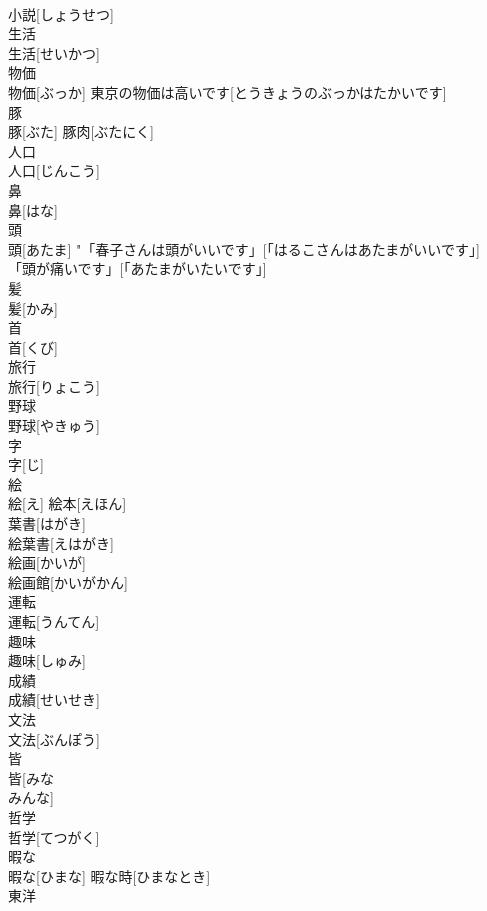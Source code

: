 \documentclass[8pt]{extreport}
\begin{document}
\begin{CJK}{UTF8}{min}
\\	小説[しょうせつ]	
\\	生活	
\\	生活[せいかつ]	
\\	物価	
\\	物価[ぶっか]	東京の物価は高いです[とうきょうのぶっかはたかいです] 
\\	豚	
\\	豚[ぶた]	豚肉[ぶたにく] 
\\	人口	
\\	人口[じんこう]	
\\	鼻	
\\	鼻[はな]	
\\	頭	
\\	頭[あたま]	"「春子さんは頭がいいです」[「はるこさんはあたまがいいです」] 
\\	「頭が痛いです」[「あたまがいたいです」] 
\\	髪	
\\	髪[かみ]	
\\	首	
\\	首[くび]	
\\	旅行	
\\	旅行[りょこう]	
\\	野球	
\\	野球[やきゅう]	
\\	字	
\\	字[じ]	
\\	絵	
\\	絵[え]	絵本[えほん] 
\\	葉書[はがき] 
\\	絵葉書[えはがき] 
\\	絵画[かいが] 
\\	絵画館[かいがかん] 
\\	運転	
\\	運転[うんてん]	
\\	趣味	
\\	趣味[しゅみ]	
\\	成績	
\\	成績[せいせき]	
\\	文法	
\\	文法[ぶんぽう]	
\\	皆	
\\	皆[みな 
\\	みんな]	
\\	哲学	
\\	哲学[てつがく]	
\\	暇な	
\\	暇な[ひまな]	暇な時[ひまなとき] 
\\	東洋	

\end{CJK}
\end{document}
